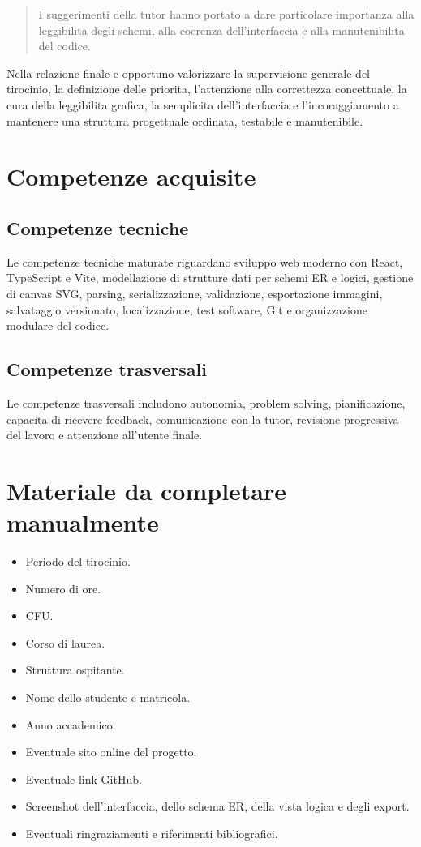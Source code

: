 \begin{quote}
I suggerimenti della tutor hanno portato a dare particolare importanza alla leggibilita degli schemi, alla coerenza dell'interfaccia e alla manutenibilita del codice.
\end{quote}

Nella relazione finale e opportuno valorizzare la supervisione generale del tirocinio, la definizione delle priorita, l'attenzione alla correttezza concettuale, la cura della leggibilita grafica, la semplicita dell'interfaccia e l'incoraggiamento a mantenere una struttura progettuale ordinata, testabile e manutenibile.

\section{Competenze acquisite}

\subsection{Competenze tecniche}

Le competenze tecniche maturate riguardano sviluppo web moderno con React, TypeScript e Vite, modellazione di strutture dati per schemi ER e logici, gestione di canvas SVG, parsing, serializzazione, validazione, esportazione immagini, salvataggio versionato, localizzazione, test software, Git e organizzazione modulare del codice.

\subsection{Competenze trasversali}

Le competenze trasversali includono autonomia, problem solving, pianificazione, capacita di ricevere feedback, comunicazione con la tutor, revisione progressiva del lavoro e attenzione all'utente finale.

\section{Materiale da completare manualmente}

\begin{itemize}
    \item Periodo del tirocinio.
    \item Numero di ore.
    \item CFU.
    \item Corso di laurea.
    \item Struttura ospitante.
    \item Nome dello studente e matricola.
    \item Anno accademico.
    \item Eventuale sito online del progetto.
    \item Eventuale link GitHub.
    \item Screenshot dell'interfaccia, dello schema ER, della vista logica e degli export.
    \item Eventuali ringraziamenti e riferimenti bibliografici.
\end{itemize}
